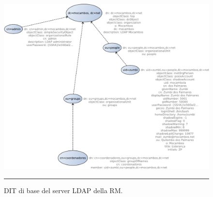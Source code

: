 \begin{figure}[htbp]
  \centering
  \includegraphics[width=\textwidth]{./Figure/DIT_ReteMocambos-crop.pdf}
  \rule{35em}{0.5pt}
  \caption[DIT di base del server LDAP della RM]{DIT di base del
    server LDAP della RM.}
  \label{fig:DIT_ReteMocambos}
\end{figure}




